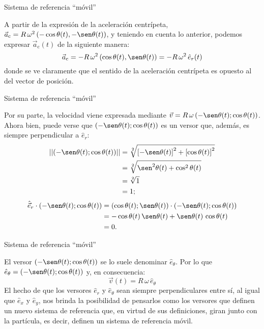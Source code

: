 \documentclass[11pt,handout,aspectratio=1610]{beamer}
\newcommand{\ver}[1]{\hat{\vec{#1}}}
\newcommand{\norm}[1]{\left\vert\left\vert #1 \right\vert\right\vert}
\begin{document}
\begin{frame}{Sistema de referencia ``móvil''}

    A partir de la expresión de la aceleración centrípeta, $\vec{a}_{\text{c}} = R \, \omega^2 \left(- \cos \theta (t), - \sen \theta (t) \right)$, y teniendo en cuenta lo anterior, podemos expresar $\vec{a}_\text{c}(t)$ de la siguiente manera: $$ \vec{a}_{\text{c}} = - R \, \omega^2 \left(\cos \theta (t), \sen \theta (t) \right) = - R \, \omega^2 \, \hat{e}_r (t) $$ donde se ve claramente que el sentido de la aceleración centrípeta es opuesto al del vector de posición.

\end{frame}

\begin{frame}{Sistema de referencia ``móvil''}

    Por su parte, la velocidad viene expresada mediante $\vec{v} = R \, \omega \left(-\sen \theta(t); \cos \theta (t)\right)$. Ahora bien, puede verse que $\left(-\sen \theta(t); \cos \theta (t)\right)$ es un versor que, además, es siempre perpendicular a $\hat{e}_r$: 
    \begin{align*}
        \norm{\left(-\sen \theta(t); \cos \theta (t)\right)} &= \sqrt[2]{\left[-\sen \theta(t)\right]^2 + \left[\cos \theta (t)\right]^2} \\
        &= \sqrt[2]{\sen^2 \theta(t) + \cos^2 \theta (t)} \\
        &= \sqrt[2]{1} \\
        &= 1;
    \end{align*}
    \begin{align*}
        \ver{e}_r \cdot \left(-\sen \theta(t); \cos \theta (t)\right) &= 
        \left(\cos \theta(t); \sen \theta(t)\right) \cdot \left(-\sen \theta(t); \cos \theta (t)\right) \\
            &= - \cos \theta(t) \, \sen \theta(t) + \sen \theta(t) \, \cos \theta (t) \\
            &= 0.
    \end{align*}

\end{frame}

\begin{frame}{Sistema de referencia ``móvil''}

    El versor $\left(-\sen \theta(t); \cos \theta (t)\right)$ se lo suele denominar $\hat{e}_\theta$. Por lo que $\hat{e}_\theta = \left(-\sen \theta(t); \cos \theta (t)\right)$ y, en consecuencia: $$\vec{v}(t) = R \, \omega \, \hat{e}_\theta$$ El hecho de que los versores $\hat{e}_r$ y $\hat{e}_\theta$ sean siempre perpendiculares entre sí, al igual que $\hat{e}_x$ y $\hat{e}_y$, nos brinda la posibilidad de pensarlos como los versores que definen un nuevo sistema de referencia que, en virtud de sus definiciones, giran junto con la partícula, es decir, definen un sistema de referencia móvil.

\end{frame}
\end{document}
